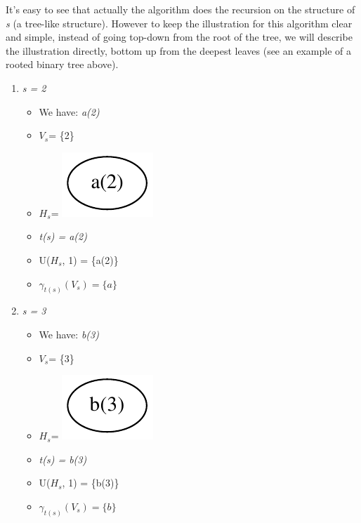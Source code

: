 \documentclass[a4paper, 12pt]{article}
\begin{document}
It's easy to see that actually the algorithm does the recursion on the structure of \textit {s} (a tree-like structure). However to keep the illustration for this algorithm clear and simple, instead of going
top-down from the root of the tree, we will describe the illustration directly, bottom up from the deepest leaves (see an example of a rooted binary tree above).
\begin{enumerate}
\item \textit {s = 2}

\begin{itemize}
\item We have: \textit {a(2)}
\item {$V_s$}= \{2\}
\item {$H_s$}= \includegraphics[scale=0.5]{image/example1}
\item \textit {t(s) = a(2)}
\item U({$H_s$}, 1) = \{a(2)\}
\item $\gamma_{t(s)}(V_{s})=\{a\}$ 
\end{itemize}

\item \textit {s = 3}
\begin{itemize}
\item We have: \textit {b(3)}
\item {$V_s$}= \{3\}
\item {$H_s$}= \includegraphics[scale=0.5]{image/example2}
\item \textit {t(s) = b(3)}
\item U({$H_s$}, 1) = \{b(3)\}
\item $\gamma_{t(s)}(V_{s})=\{b\}$ 
\end{itemize}


\end{enumerate}
\end{document}
